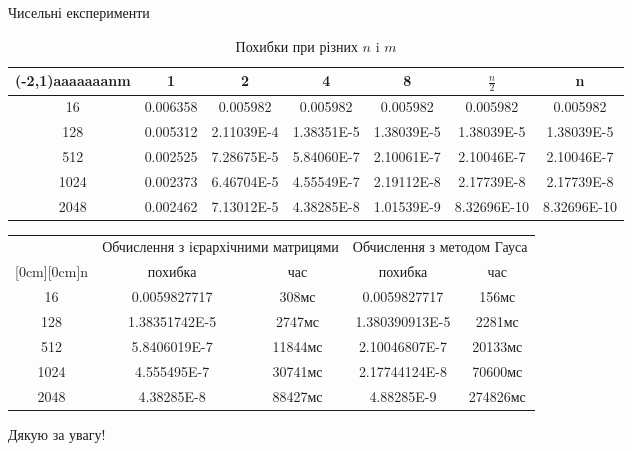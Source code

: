 \documentclass[12pt]{beamer}
\begin{document}
\begin{frame}{Чисельні експерименти}
	\scriptsize
		\begin{table}[ht]
			\centering 
			\begin{tabular}{c c c c c c c} %
				\hline %
				
				\diaghead(-2,1){aaaaaaa}{n}{m} & 1 & 2 & 4 & 8& $\frac{n}{2}$ & n \\ [0.25ex] %
				\hline \hline%
				16 & 0.006358& 0.005982& 0.005982 & 0.005982 & 0.005982 &0.005982  \\ %
				128 & 0.005312& 2.11039E-4 & 1.38351E-5&1.38039E-5 &1.38039E-5&1.38039E-5\\
				512 &0.002525 & 7.28675E-5& 5.84060E-7 &2.10061E-7&2.10046E-7&2.10046E-7\\
				1024 & 0.002373 &6.46704E-5 & 4.55549E-7& 2.19112E-8 &2.17739E-8&2.17739E-8\\
				2048 & 0.002462& 7.13012E-5& 4.38285E-8 &1.01539E-9 &8.32696E-10&8.32696E-10
				\\ [0.5ex] %
				\hline %
			\end{tabular}
			\caption{Похибки при різних $n$ i $m$}
			\label{table:nonlin} %
		\end{table}
	\scriptsize
	\begin{block}{} 
		\begin{table}[ht]
			\centering 
			\begin{tabular}{|c| c| c| c| c|} %
				\hline%
				
				
				& \multicolumn{2}{c|}{Обчислення з ієрархічними матрицями} &\multicolumn{2}{c|}{Обчислення з методом Гауса } \\
				
				\raisebox{1.5ex}[0cm][0cm]{n}& похибка &час & похибка & час \\ [0.25ex] %
				\hline %
				16 & 0.0059827717& 308мс& 0.0059827717 & 156мс \\ %
				128 & 1.38351742E-5& 2747мс & 1.380390913E-5&2281мс \\
				512 &5.8406019E-7 & 11844мс & 2.10046807E-7 &20133мс\\
				1024 & 4.555495E-7 &30741мс& 2.17744124E-8& 70600мс \\
				2048 & 4.38285E-8& 88427мс& 4.88285E-9 & 274826мс
				\\ [0.5ex] %
				\hline %
			\end{tabular}	
		\end{table}
	\end{block}
\end{frame}


\begin{frame}
	\begin{center}
		\Huge{Дякую за увагу!}
	\end{center}
\end{frame}
\end{document}
